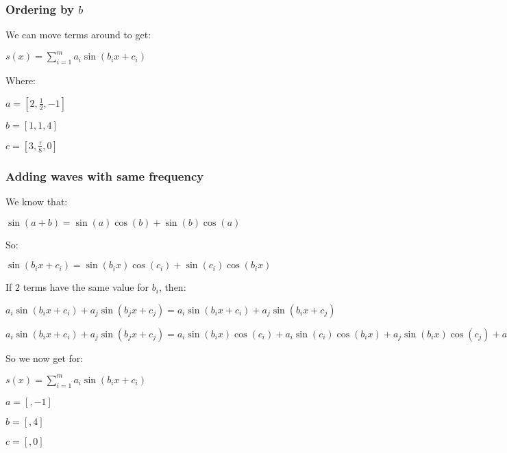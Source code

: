 \subsubsection{Ordering by \(b\)}

We can move terms around to get:

\(s(x)=\sum^m_{i=1}a_i\sin(b_ix+c_i)\)

Where:

\(a=[2,\frac{1}{2},-1]\)

\(b=[1,1,4]\)

\(c=[3,\frac{\tau}{8},0]\)

\subsubsection{Adding waves with same frequency}

We know that:

\(\sin(a+b)=\sin(a)\cos(b)+\sin(b)\cos(a)\)

So:

\(\sin(b_ix+c_i)=\sin(b_ix)\cos(c_i)+\sin(c_i)\cos(b_ix)\)

If \(2\) terms have the same value for \(b_i\), then:

\(a_i\sin(b_ix+c_i)+a_j\sin(b_jx+c_j)=a_i\sin(b_ix+c_i)+a_j\sin(b_ix+c_j)\)

\(a_i\sin(b_ix+c_i)+a_j\sin(b_jx+c_j)=a_i\sin(b_ix)\cos(c_i)+a_i\sin(c_i)\cos(b_ix)+a_j\sin(b_ix)\cos(c_j)+a_j\sin(c_j)\cos(b_ix)\)

So we now get for:

\(s(x)=\sum^m_{i=1}a_i\sin(b_ix+c_i)\)

\(a=[,-1]\)

\(b=[,4]\)

\(c=[,0]\)

